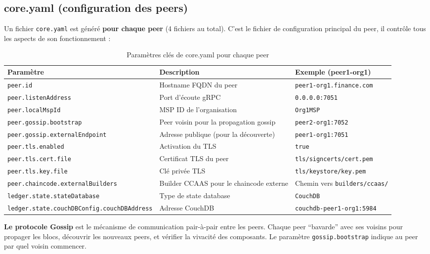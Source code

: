 \documentclass[12pt,a4paper,twoside]{report}
\begin{document}
\subsection{core.yaml (configuration des peers)}

Un fichier \texttt{core.yaml} est généré \textbf{pour chaque peer} (4 fichiers au total). C'est le fichier de configuration principal du peer, il contrôle tous les aspects de son fonctionnement :

\begin{table}[H]
\centering
\begin{tabularx}{\textwidth}{lXp{4cm}}
\toprule
\textbf{Paramètre} & \textbf{Description} & \textbf{Exemple (peer1-org1)} \\
\midrule
\texttt{peer.id} & Hostname FQDN du peer & \texttt{peer1-org1.finance.com} \\
\texttt{peer.listenAddress} & Port d'écoute gRPC & \texttt{0.0.0.0:7051} \\
\texttt{peer.localMspId} & MSP ID de l'organisation & \texttt{Org1MSP} \\
\texttt{peer.gossip.bootstrap} & Peer voisin pour la propagation gossip & \texttt{peer2-org1:7052} \\
\texttt{peer.gossip.externalEndpoint} & Adresse publique (pour la découverte) & \texttt{peer1-org1:7051} \\
\texttt{peer.tls.enabled} & Activation du TLS & \texttt{true} \\
\texttt{peer.tls.cert.file} & Certificat TLS du peer & \texttt{tls/signcerts/cert.pem} \\
\texttt{peer.tls.key.file} & Clé privée TLS & \texttt{tls/keystore/key.pem} \\
\texttt{peer.chaincode.externalBuilders} & Builder CCAAS pour le chaincode externe & Chemin vers \texttt{builders/ccaas/} \\
\texttt{ledger.state.stateDatabase} & Type de state database & \texttt{CouchDB} \\
\texttt{ledger.state.couchDBConfig.couchDBAddress} & Adresse CouchDB & \texttt{couchdb-peer1-org1:5984} \\
\bottomrule
\end{tabularx}
\caption{Paramètres clés de core.yaml pour chaque peer}
\end{table}

\begin{tipbox}
\textbf{Le protocole Gossip} est le mécanisme de communication pair-à-pair entre les peers. Chaque peer ``bavarde'' avec ses voisins pour propager les blocs, découvrir les nouveaux peers, et vérifier la vivacité des composants. Le paramètre \texttt{gossip.bootstrap} indique au peer par quel voisin commencer.
\end{tipbox}
\end{document}
